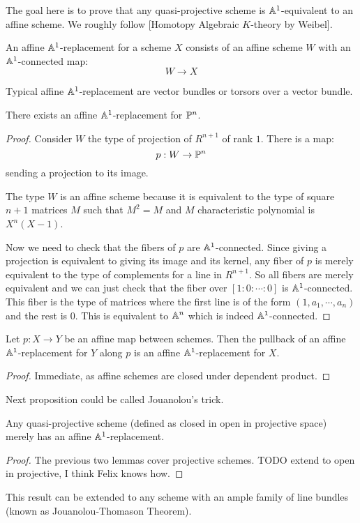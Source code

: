 The goal here is to prove that any quasi-projective scheme is $\mathbb{A}^1$-equivalent to an affine scheme. We roughly follow [Homotopy Algebraic $K$-theory by Weibel].

\begin{definition}
An affine $\mathbb{A}^1$-replacement for a scheme $X$ consists of an affine scheme $W$ with an $\mathbb{A}^1$-connected map:
\[W\to X\]
\end{definition}

Typical affine $\mathbb{A}^1$-replacement are vector bundles or torsors over a vector bundle.

\begin{lemma}
There exists an affine $\mathbb{A}^1$-replacement for $\mathbb{P}^n$.
\end{lemma}

\begin{proof}
Consider $W$ the type of projection of $R^{n+1}$ of rank $1$. There is a map:
\[p:W\to \mathbb{P}^n\] 
sending a projection to its image.

The type $W$ is an affine scheme because it is equivalent to the type of square $n+1$ matrices $M$ such that $M^2=M$ and $M$ characteristic polynomial is $X^n(X-1)$. 

Now we need to check that the fibers of $p$ are $\mathbb{A}^1$-connected. Since giving a projection is equivalent to giving its image and its kernel, any fiber of $p$ is merely equivalent to the type of complements for a line in $R^{n+1}$. So all fibers are merely equivalent and we can just check that the fiber over $[1:0:\cdots:0]$ is $\mathbb{A}^1$-connected. This fiber is the type of matrices where the first line is of the form $(1,a_1,\cdots,a_n)$ and the rest is $0$. This is equivalent to $\mathbb{A}^n$ which is indeed $\mathbb{A}^1$-connected.
\end{proof}

\begin{lemma}
Let $p:X\to Y$ be an affine map between schemes. Then the pullback of an affine $\mathbb{A}^1$-replacement for $Y$ along $p$ is an affine $\mathbb{A}^1$-replacement for $X$.
\end{lemma}

\begin{proof}
Immediate, as affine schemes are closed under dependent product.
\end{proof}

Next proposition could be called Jouanolou's trick.

\begin{proposition}
Any quasi-projective scheme (defined as closed in open in projective space) merely has an affine $\mathbb{A}^1$-replacement.
\end{proposition}

\begin{proof}
The previous two lemmas cover projective schemes. TODO extend to open in projective, I think Felix knows how.
\end{proof}

\begin{remark}
This result can be extended to any scheme with an ample family of line bundles (known as Jouanolou-Thomason Theorem).
\end{remark}


